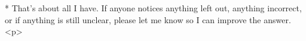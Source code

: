 * That's about all I have. If anyone notices anything left out, anything incorrect, or if anything is still unclear, please let me know so I can improve the answer.
<p>



